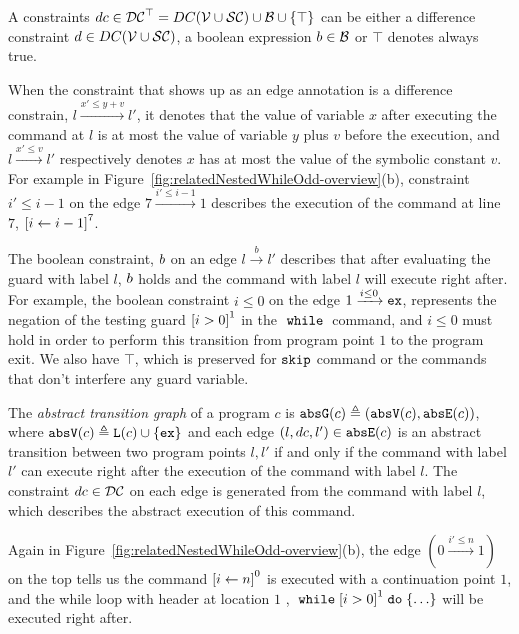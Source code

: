 \begin{defn}[Constraints]
A constraints $dc \in \mathcal{DC}^{\top} = DC(\mathcal{V}  \cup \mathcal{SC}) \cup \mathcal{B}\cup \{\top\}$  can be either a
difference constraint $d \in DC(\mathcal{V}  \cup \mathcal{SC})$, a boolean expression $b \in \mathcal{B}$
or $\top$ denotes always true.
\end{defn}

When the constraint that shows up as an edge annotation is a difference constrain, $l \xrightarrow{x' \leq y + v} l'$,
it denotes that
the value of variable $x$
after executing the command at $l$ is at most
the value of variable $y$ plus $v$ before the execution,
and $l \xrightarrow{x' \leq v} l'$ respectively denotes
$x$ has at most
the value of the symbolic constant $v$.
For example in Figure~\ref{fig:relatedNestedWhileOdd-overview}(b), constraint $i' \leq i - 1$ on the edge $7 \xrightarrow{i' \leq i - 1} 1$
describes the execution of
 the command at line $7$, 
$\clabel{\assign{i}{i - 1}}^{7}$. 


The boolean constraint, $b$ on an edge $l \xrightarrow{b} l'$ describes
that after evaluating the guard with label $l$,
$b$ holds and the command with label $l$ will execute right after.
For example, the boolean constraint $i \leq 0 $ on the edge $1 \xrightarrow{i \leq 0} \mathtt{ex}$, 
represents the negation of the testing guard $\clabel{i > 0}^1$
in the $\;\mathtt{while}\;$ command, and $i \leq 0$ must hold in order to perform this transition from program point $1$ to
the program exit. 
We also have $\top$, which is preserved for $\mathtt{skip}$ command or the commands that don't interfere any guard variable.

\begin{defn}
  \label{def:abs_cfg}
  The \emph{abstract transition graph} of a program $c$ is $\mathtt{abs}{\mathtt{G}}(c) \triangleq (\mathtt{abs}{\mathtt{V}}(c), \mathtt{abs}{\mathtt{E}}(c))$, where
  $\mathtt{abs}{\mathtt{V}}(c) \triangleq \mathtt{L}(c)\cup\{\mathtt{ex}\}$
  and 
  each edge $(l, dc, l') \in \mathtt{abs}{\mathtt{E}}(c)$ is an abstract transition
between two program points $l, l'$ if and only if
the command with label $l'$ can execute right after the execution of the command with label $l$.
The constraint $dc \in \mathcal{DC}$ on each edge is generated from the command with label $l$, which describes the abstract execution of this command.
\end{defn}
Again in Figure~\ref{fig:relatedNestedWhileOdd-overview}(b),
the edge $(0 \xrightarrow{i' \leq n} 1)$ on the top tells us the command 
$\clabel{\assign{i}{n}}^0$ is executed with a continuation point $1$, and the while loop with header at location $1$ , $\ewhile \clabel{i > 0}^1 \edo \{\ldots\}$ will be executed right after.

